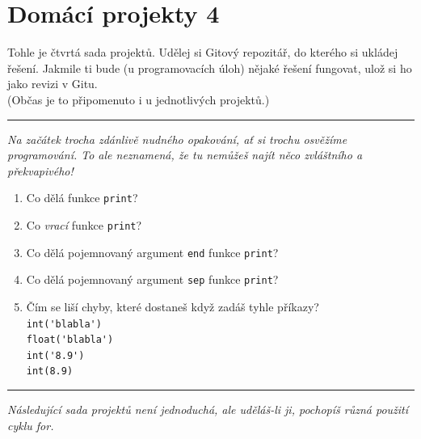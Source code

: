\documentclass[a4paper,10pt]{article}
\newcommand\plsetno{4}
\newcommand\startsection[1]{
     \vspace{0.2ex}
    \hrule
    {\fontspec{Oxygen} \tiny
     \vspace{-1ex}
     \emph{#1}
     \vspace{-1.5em}
    }
}
\begin{document}
\section*{Domácí projekty {\plsetno}}

Tohle je čtvrtá sada projektů. Udělej si Gitový repozitář, do kterého si ukládej řešení.
Jakmile ti bude (u programovacích úloh) nějaké řešení fungovat, ulož si ho jako revizi v Gitu.
\\(Občas je to připomenuto i u jednotlivých projektů.)

\startsection{Na začátek trocha zdánlivě nudného opakování, ať si trochu osvěžíme programování.
To ale neznamená, že tu nemůžeš najít něco zvláštního a překvapivého!}

\begin{enumerate}
\item Co dělá funkce \verb+print+?

\item Co \emph{vrací} funkce \verb+print+?

\item Co dělá pojemnovaný argument \texttt{end} funkce \verb+print+?

\item Co dělá pojemnovaný argument \texttt{sep} funkce \verb+print+?

\item Čím se liší chyby, které dostaneš když zadáš tyhle příkazy?
    \\\verb+int('blabla')+
    \\\verb+float('blabla')+
    \\\verb+int('8.9')+
    \\\verb+int(8.9)+

\end{enumerate}

\startsection{Následující sada projektů není jednoduchá, ale uděláš-li ji, pochopíš různá použití cyklu for.}
\end{document}
